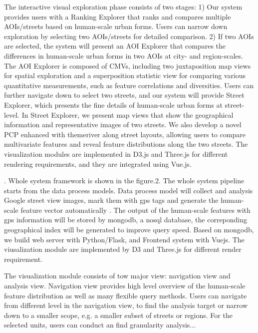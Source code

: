 The interactive visual exploration phase consists of two stages:
1) Our system provides users with a Ranking Explorer that ranks and compares multiple AOIs/streets based on human-scale urban forms.
Users can narrow down exploration by selecting two AOIs/streets for detailed comparison. 
2) If two AOIs are selected, the system will present an AOI Explorer that compares the differences in human-scale urban forms in two AOIs at city- and region-scales.
The AOI Explorer is composed of CMVs, including two juxtaposition map views for spatial exploration and a superposition statistic view for comparing various quantitative measurements, such as feature correlations and diversities.
Users can further navigate down to select two streets, and our system will provide Street Explorer, which presents the fine details of human-scale urban forms at street-level.
In Street Explorer, we present map views that show the geographical information and representative images of two streets.
We also develop a novel PCP enhanced with themeriver along street layouts, allowing users to compare multivariate features and reveal feature distributions along the two streets.
The visualization modules are implemented in D3.js and Three.js for different rendering requirements, and they are integrated using Vue.js.


. Whole system framework is shown in the figure.2.
The whole system pipeline starts from the data process models. Data process model will collect and analysis Google street view images, mark them with gps tags and generate the human-scale feature vector automatically . The output of the human-scale features with gps information will be stored by mongodb, a nosql database, the correponding geographical index will be generated to improve query speed. Based on mongodb, we build web server with Python/Flask, and Frontend system with Vuejs. The viusalization module are implemented by D3 and Three.js for different render requirement.

The visualization module consists of tow major view: navigation view and analysis view. Navigation view provides high level overview of the human-scale feature distribution as well as many flexible query methods. Users can navigate from different level in the navigation view, to find the analysis target or narrow down to a smaller scope, e.g. a smaller subset of streets or regions. For the selected units, users can conduct an find granularity analysis...

\fi